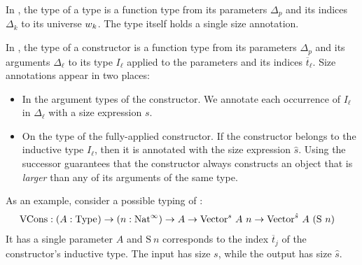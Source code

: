 In , the type of a \coinductive type is a function type from its parameters $\Delta_p$ and its indices $\Delta_k$ to its universe $w_k$.
The \coinductive type itself holds a single size annotation.

In , the type of a constructor is a function type from its parameters $\Delta_p$ and its arguments $\Delta_\ell$ to its \coinductive type $I_\ell$ applied to the parameters and its indices $\overline{t}_\ell$.
Size annotations appear in two places:
\begin{itemize}
    \item In the argument types of the constructor.
      We annotate each occurrence of $I_\ell$ in $\Delta_\ell$ with a size expression $s$.
    \item On the \coinductive type of the fully-applied constructor.
      If the constructor belongs to the inductive type $I_\ell$, then it is annotated with the size expression $\hat{s}$.
      Using the successor guarantees that the constructor always constructs an object that is \textit{larger} than any of its arguments of the same type.
\end{itemize}
As an example, consider a possible typing of :
\begin{align*}
\text{VCons} &: (A: \text{Type}_{}) \to (n:\text{Nat}^\infty) \to A \to \text{Vector}^s ~ A ~ n \to \text{Vector}^{\hat{s}} ~ A ~ (\text{S} ~ n)
\end{align*}
It has a single parameter $A$ and $\text{S} ~ n$ corresponds to the index $\overline{t}_j$ of the constructor's inductive type.
The input  has size $s$, while the output  has size $\hat{s}$.

